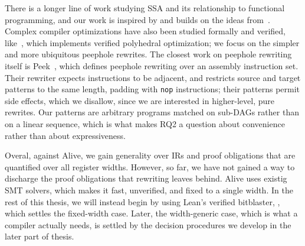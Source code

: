 There is a longer line of work studying SSA and its relationship to functional
programming, and our work is inspired by and builds on the ideas
from~\cite{kelsey1995correspondence,appel1998ssa,barthe2014formal}. Complex
compiler optimizations have also been studied formally and verified,
like~\cite{courant2021verified}, which implements verified polyhedral
optimization; we focus on the simpler and more ubiquitous peephole rewrites. The
closest work on peephole rewriting itself is Peek~\cite{mullen2016verified},
which defines peephole rewriting over an assembly instruction set. Their
rewriter expects instructions to be adjacent, and restricts source and target
patterns to the same length, padding with \texttt{nop} instructions; their
patterns permit side effects, which we disallow, since we are interested in
higher-level, pure rewrites. Our patterns are arbitrary programs matched on
sub-DAGs rather than on a linear sequence, which is what makes RQ2 a question
about convenience rather than about expressiveness.

Overal, against Alive, we gain generality over IRs and proof obligations that are quantified over all register widths.
However, so far, we have not gained a way to discharge the proof obligations that rewriting leaves behind.
Alive uses existig SMT solvers, which makes it fast, unverified, and fixed to a single width.
In the rest of this thesis, we will instead begin by using Lean's verified bitblaster, \bvdecide{},
which settles the fixed-width case. Later, the width-generic case, which
is what a compiler actually needs, is settled by the decision procedures we develop in the later part of thesis.
